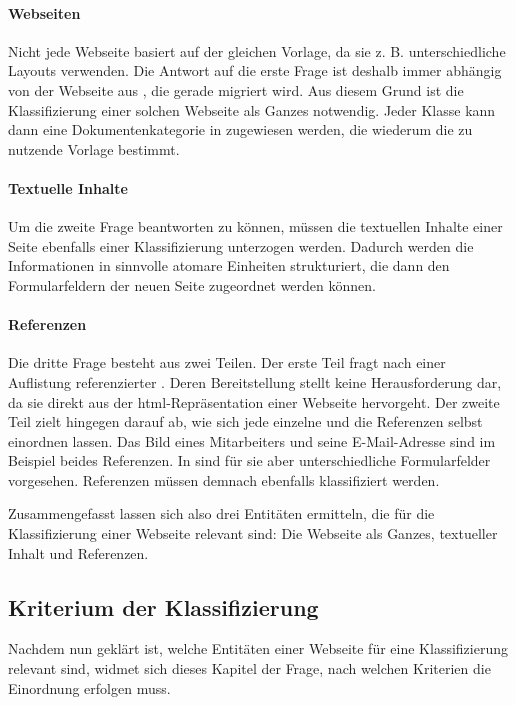         \paragraph{Webseiten}
        Nicht jede Webseite basiert auf der gleichen Vorlage, da sie z. B. unterschiedliche Layouts verwenden.
        Die Antwort auf die erste Frage ist deshalb immer abhängig von der Webseite aus {\wordpress}, die gerade migriert wird.
        Aus diesem Grund ist die Klassifizierung einer solchen Webseite als Ganzes notwendig.
        Jeder Klasse kann dann eine Dokumentenkategorie in {\imperia}
        zugewiesen werden, die wiederum die zu nutzende Vorlage bestimmt.

        \paragraph{Textuelle Inhalte}
        Um die zweite Frage beantworten zu können,
        müssen die textuellen Inhalte einer Seite ebenfalls einer Klassifizierung
        unterzogen werden.
        Dadurch werden die Informationen in sinnvolle atomare Einheiten strukturiert,
        die dann den Formularfeldern der neuen Seite zugeordnet werden können.

        \paragraph{Referenzen}
        Die dritte Frage besteht aus zwei Teilen.
        Der erste Teil fragt nach einer Auflistung
        referenzierter {\resources}.
        Deren Bereitstellung stellt keine Herausforderung dar,
        da sie direkt aus der \gls{html}-Repräsentation einer Webseite hervorgeht.
        Der zweite Teil zielt hingegen darauf ab,
        wie sich jede einzelne {\resource} und die Referenzen selbst einordnen lassen.
        Das Bild eines Mitarbeiters und seine E-Mail-Adresse sind im Beispiel beides Referenzen.
        In {\imperia} sind für sie aber unterschiedliche Formularfelder vorgesehen.
        Referenzen müssen demnach ebenfalls klassifiziert werden.

        Zusammengefasst lassen sich also drei Entitäten ermitteln,
        die für die Klassifizierung einer Webseite relevant sind:
        Die Webseite als Ganzes, textueller Inhalt und Referenzen.

    \subsection{Kriterium der Klassifizierung}
        \label{section:ClassificationCriteria}
        Nachdem nun geklärt ist, welche Entitäten einer Webseite für
        eine Klassifizierung relevant sind,
        widmet sich dieses Kapitel der Frage, nach welchen
        Kriterien die Einordnung erfolgen muss.

